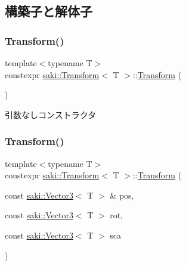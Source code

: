 \subsection{構築子と解体子}
\mbox{\label{classsaki_1_1_transform_abdd7b5f310bccc56b804a2cf21890a35}} 
\subsubsection{\texorpdfstring{Transform()}{Transform()}\hspace{0.1cm}{\footnotesize\ttfamily [1/4]}}
{\footnotesize\ttfamily template$<$typename T$>$ \\
constexpr \mbox{\hyperlink{classsaki_1_1_transform}{saki\+::\+Transform}}$<$ T $>$\+::\mbox{\hyperlink{classsaki_1_1_transform}{Transform}} (\begin{DoxyParamCaption}{ }\end{DoxyParamCaption})\hspace{0.3cm}{\ttfamily [inline]}}



引数なしコンストラクタ 

\mbox{\label{classsaki_1_1_transform_a63e2a4e0fe65040566c13897255af67e}} 
\subsubsection{\texorpdfstring{Transform()}{Transform()}\hspace{0.1cm}{\footnotesize\ttfamily [2/4]}}
{\footnotesize\ttfamily template$<$typename T$>$ \\
constexpr \mbox{\hyperlink{classsaki_1_1_transform}{saki\+::\+Transform}}$<$ T $>$\+::\mbox{\hyperlink{classsaki_1_1_transform}{Transform}} (\begin{DoxyParamCaption}\item[{const \mbox{\hyperlink{classsaki_1_1_vector3}{saki\+::\+Vector3}}$<$ T $>$ \&}]{pos,  }\item[{const \mbox{\hyperlink{classsaki_1_1_vector3}{saki\+::\+Vector3}}$<$ T $>$}]{rot,  }\item[{const \mbox{\hyperlink{classsaki_1_1_vector3}{saki\+::\+Vector3}}$<$ T $>$}]{sca }\end{DoxyParamCaption})\hspace{0.3cm}{\ttfamily [inline]}}



